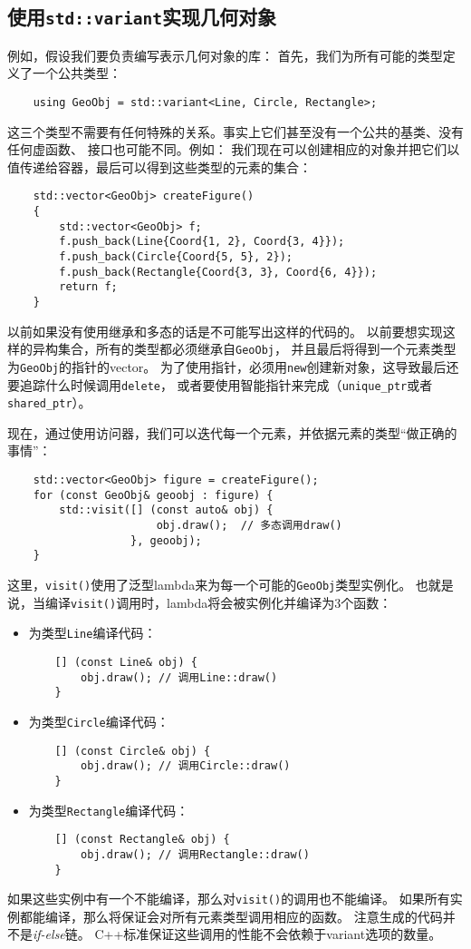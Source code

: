 \subsection{使用\texttt{std::variant}实现几何对象}
例如，假设我们要负责编写表示几何对象的库：
首先，我们为所有可能的类型定义了一个公共类型：
\begin{lstlisting}
    using GeoObj = std::variant<Line, Circle, Rectangle>;
\end{lstlisting}
这三个类型不需要有任何特殊的关系。事实上它们甚至没有一个公共的基类、没有任何虚函数、
接口也可能不同。例如：
我们现在可以创建相应的对象并把它们以值传递给容器，最后可以得到这些类型的元素的集合：
\begin{lstlisting}
    std::vector<GeoObj> createFigure()
    {
        std::vector<GeoObj> f;
        f.push_back(Line{Coord{1, 2}, Coord{3, 4}});
        f.push_back(Circle{Coord{5, 5}, 2});
        f.push_back(Rectangle{Coord{3, 3}, Coord{6, 4}});
        return f;
    }
\end{lstlisting}
以前如果没有使用继承和多态的话是不可能写出这样的代码的。
以前要想实现这样的异构集合，所有的类型都必须继承自\texttt{GeoObj}，
并且最后将得到一个元素类型为\texttt{GeoObj}的指针的vector。
为了使用指针，必须用\texttt{new}创建新对象，这导致最后还要追踪什么时候调用\texttt{delete}，
或者要使用智能指针来完成（\texttt{unique\_ptr}或者\texttt{shared\_ptr}）。

现在，通过使用访问器，我们可以迭代每一个元素，并依据元素的类型“做正确的事情”：
\begin{lstlisting}
    std::vector<GeoObj> figure = createFigure();
    for (const GeoObj& geoobj : figure) {
        std::visit([] (const auto& obj) {
                       obj.draw();  // 多态调用draw()
                   }, geoobj);
    }
\end{lstlisting}
这里，\texttt{visit()}使用了泛型lambda来为每一个可能的\texttt{GeoObj}类型实例化。
也就是说，当编译\texttt{visit()}调用时，lambda将会被实例化并编译为3个函数：
\begin{itemize}
    \item 为类型\texttt{Line}编译代码：
    \begin{lstlisting}
    [] (const Line& obj) {
        obj.draw(); // 调用Line::draw()
    }
    \end{lstlisting}
    \item 为类型\texttt{Circle}编译代码：
    \begin{lstlisting}
    [] (const Circle& obj) {
        obj.draw(); // 调用Circle::draw()
    }
    \end{lstlisting}
    \item 为类型\texttt{Rectangle}编译代码：
    \begin{lstlisting}
    [] (const Rectangle& obj) {
        obj.draw(); // 调用Rectangle::draw()
    }
    \end{lstlisting}
\end{itemize}
如果这些实例中有一个不能编译，那么对\texttt{visit()}的调用也不能编译。
如果所有实例都能编译，那么将保证会对所有元素类型调用相应的函数。
注意生成的代码并不是\emph{if-else}链。
C++标准保证这些调用的性能不会依赖于variant选项的数量。

